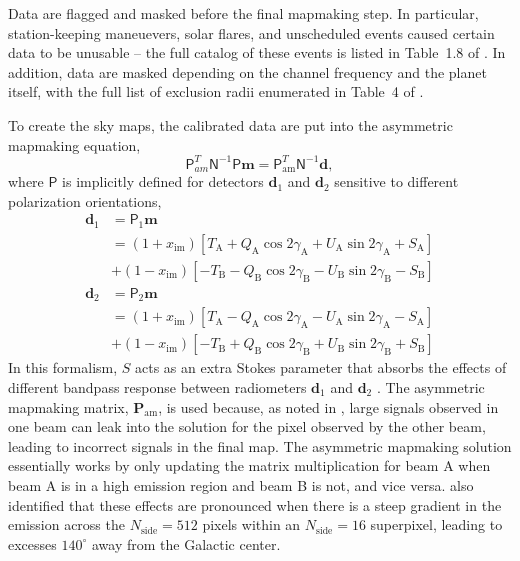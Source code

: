 \documentclass[twocolumn]{../../common/aa}
\newcommand{\A}[0]{\mathrm{A}}
\newcommand{\B}[0]{\mathrm{B}}
\begin{document}
Data are flagged and masked before the final mapmaking step. In particular, station-keeping maneuevers, solar flares, and unscheduled events caused certain data to be unusable -- the full catalog of these events is listed in Table~1.8 of \citet{wmapexsupp}. In addition, data are masked depending on the channel frequency and the planet itself, with the full list of exclusion radii enumerated in Table~4 of \citet{bennett2012}.

To create the sky maps, the calibrated data are put into the asymmetric mapmaking equation,
\begin{equation}
	\mathsf P_{am}^T\mathsf N^{-1}\mathsf P\boldsymbol m=\mathsf P^T_\mathrm{am}\mathsf N^{-1}\boldsymbol d,
\end{equation}
where $\mathsf P$ is implicitly defined for detectors $\boldsymbol d_1$ and $\boldsymbol d_2$ sensitive to different polarization orientations,
\begin{align}
	\boldsymbol d_1&=\mathsf P_1\boldsymbol m
	\nonumber
	\\
	&=(1+x_\mathrm{im})[T_\A+Q_\A\cos2\gamma_\A+U_\A\sin2\gamma_\A+S_\A]
	\nonumber
	\\
	&+(1-x_\mathrm{im})[-T_\B-Q_\B\cos2\gamma_\B-U_\B\sin2\gamma_\B-S_\B]
	\\
	\boldsymbol d_2&=\mathsf P_2\boldsymbol m
	\nonumber
	\\
	&=(1+x_\mathrm{im})[T_\A-Q_\A\cos2\gamma_\A-U_\A\sin2\gamma_\A-S_\A]
	\nonumber
	\\
	&+(1-x_\mathrm{im})[-T_\B+Q_\B\cos2\gamma_\B+U_\B\sin2\gamma_\B+S_\B]
\end{align}
In this formalism, $S$ acts as an extra Stokes parameter that absorbs the effects of different bandpass response between radiometers $\boldsymbol d_1$ and $\boldsymbol d_2$ \citep{jarosik2007}.
The asymmetric mapmaking matrix, $\boldsymbol P_\mathrm{am}$, is used because, as noted in \citet{jarosik2010}, large signals observed in one beam can leak into the solution for the pixel observed by the other beam, leading to incorrect signals in the final map. The asymmetric mapmaking solution essentially works by only updating the matrix multiplication for beam A when beam A is in a high emission region and beam B is not, and vice versa. \citet{bennett2012} also identified that these effects are pronounced when there is a steep gradient in the emission across the $N_\mathrm{side}=512$ pixels within an $N_\mathrm{side}=16$ superpixel, leading to excesses $140^\circ$ away from the Galactic center.
\end{document}

